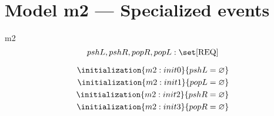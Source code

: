 \documentclass[12pt]{amsart}
\newcommand{\REQ}{\text{REQ}}
\begin{document}
\section{Model m2 --- Specialized events}
  
\begin{machine}{m2}
  \[ \variable{pshL,pshR,popR,popL : \set [\REQ]} \]
  \begin{description}
  \end{description}
  \begin{align}
    \initialization{m2:init0}{pshL = \emptyset} \\
    \initialization{m2:init1}{popL = \emptyset} \\
    \initialization{m2:init2}{pshR = \emptyset} \\
    \initialization{m2:init3}{popR = \emptyset} 
  \end{align}

\end{machine}
\end{document}
